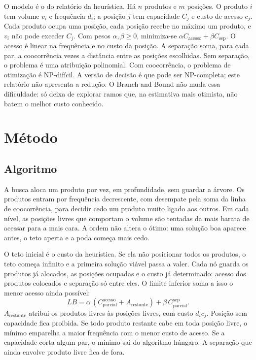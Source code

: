 \documentclass[conference,a4paper]{IEEEtran}
\begin{document}
O modelo é o do relatório da heurística.
Há \(n\) produtos e \(m\) posições.
O produto \(i\) tem volume \(v_i\) e frequência \(d_i\); a posição \(j\) tem capacidade \(C_j\) e custo de acesso \(c_j\).
Cada produto ocupa uma posição, cada posição recebe no máximo um produto, e \(v_i\) não pode exceder \(C_j\).
Com pesos \(\alpha, \beta \ge 0\), minimiza-se \(\alpha C_{\mathrm{acesso}} + \beta C_{\mathrm{sep}}\).
O acesso é linear na frequência e no custo da posição.
A separação soma, para cada par, a coocorrência vezes a distância entre as posições escolhidas.
Sem separação, o problema é uma atribuição polinomial. Com coocorrência, o problema de otimização é NP-difícil. A versão de decisão é que pode ser NP-completa; este relatório não apresenta a redução.
O Branch and Bound não muda essa dificuldade: só deixa de explorar ramos que, na estimativa mais otimista, não batem o melhor custo conhecido.

\section{Método}

\subsection{Algoritmo}
A busca aloca um produto por vez, em profundidade, sem guardar a árvore.
Os produtos entram por frequência decrescente, com desempate pela soma da linha de coocorrência, para decidir cedo um produto muito ligado aos outros.
Em cada nível, as posições livres que comportam o volume são tentadas da mais barata de acessar para a mais cara.
A ordem não altera o ótimo: uma solução boa aparece antes, o teto aperta e a poda começa mais cedo.

O teto inicial é o custo da heurística.
Se ela não posicionar todos os produtos, o teto começa infinito e a primeira solução viável passa a valer.
Cada nó guarda os produtos já alocados, as posições ocupadas e o custo já determinado: acesso dos produtos colocados e separação só entre eles.
O limite inferior soma a isso o menor acesso ainda possível:
\begin{equation}
LB = \alpha\,(C_{\mathrm{parcial}}^{\mathrm{acesso}} + A_{\mathrm{restante}}) + \beta\,C_{\mathrm{parcial}}^{\mathrm{sep}}.
\end{equation}
\(A_{\mathrm{restante}}\) atribui os produtos livres às posições livres, com custo \(d_i c_j\).
Posição sem capacidade fica proibida.
Se todo produto restante cabe em toda posição livre, o mínimo emparelha a maior frequência com o menor custo de acesso.
Se a capacidade corta algum par, o mínimo sai do algoritmo húngaro.
A separação que ainda envolve produto livre fica de fora.
\end{document}
